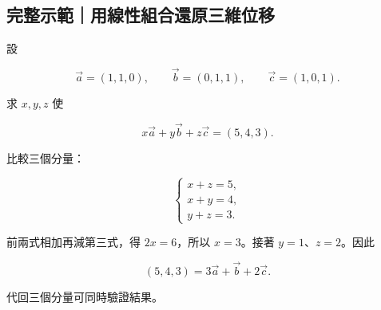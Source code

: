 \documentclass[11pt,a4paper]{article}
\begin{document}
\begin{HandoutWorkedExample}

\subsection{完整示範｜用線性組合還原三維位移}\label{ux5b8cux6574ux793aux7bc4ux7528ux7ddaux6027ux7d44ux5408ux9084ux539fux4e09ux7dadux4f4dux79fb}

設

\[
\vec a=(1,1,0),\qquad
\vec b=(0,1,1),\qquad
\vec c=(1,0,1).
\]

求 \(x,y,z\) 使

\[
x\vec a+y\vec b+z\vec c=(5,4,3).
\]

比較三個分量：

\[
\begin{cases}
x+z=5,\\
x+y=4,\\
y+z=3.
\end{cases}
\]

前兩式相加再減第三式，得 \(2x=6\)，所以 \(x=3\)。接著 \(y=1\)、\(z=2\)。因此

\[
\boxed{(5,4,3)=3\vec a+\vec b+2\vec c}.
\]

代回三個分量可同時驗證結果。

\end{HandoutWorkedExample}
\end{document}

